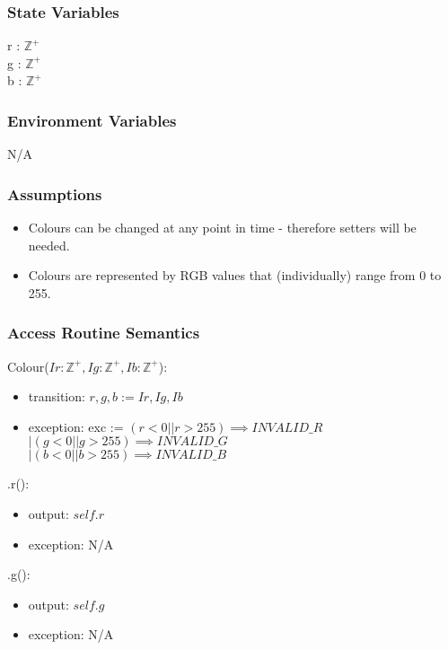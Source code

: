 \documentclass[12pt, titlepage]{article}
\begin{document}
\subsubsection{State Variables}
r : $\mathbb{Z}^+$ \\
g : $\mathbb{Z}^+$ \\
b : $\mathbb{Z}^+$ \\

\subsubsection{Environment Variables}
N/A

\subsubsection{Assumptions}
\begin{itemize}
	\item Colours can be changed at any point in time - therefore setters will 
	be needed.
	\item Colours are represented by RGB values that (individually) range from 
	0 to 255.
\end{itemize}

\subsubsection{Access Routine Semantics}
\noindent Colour($Ir: \mathbb{Z}^+, Ig: \mathbb{Z}^+, Ib: \mathbb{Z}^+$):
\begin{itemize}
	\item transition: $r, g, b := Ir, Ig, Ib$
	\item exception: exc := $(r < 0 || r > 255) \implies INVALID\_R$ \\
		$ | (g < 0 || g > 255) \implies INVALID\_G$ \\ $| (b < 0 || b > 255) 
		\implies INVALID\_B$
\end{itemize}

\noindent .r():
\begin{itemize}
	\item output: $self.r$
	\item exception: N/A
\end{itemize}

\noindent .g():
\begin{itemize}
	\item output: $self.g$
	\item exception: N/A
\end{itemize}
\end{document}
